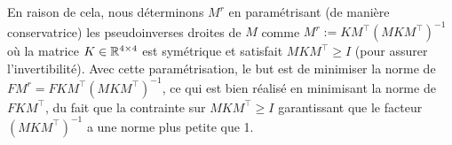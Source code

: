 En raison de cela, nous déterminons $M^r$ en paramétrisant (de manière conservatrice) les pseudoinverses droites de $M$ comme $M^r := KM^\top ( MKM^\top)^{-1}$ où la matrice $K \in {\mathbb R}^{4\times 4}$ est symétrique et satisfait $MKM^\top \geq I$ (pour assurer l'invertibilité). Avec cette paramétrisation, le but est de minimiser la norme de $FM^r = F KM^\top ( MKM^\top)^{-1}$, ce qui est bien réalisé en minimisant la norme de $F KM^\top$, du fait que la contrainte sur $MKM^\top \geq I$ garantissant que le facteur $( MKM^\top)^{-1}$ a une norme plus petite que 1.



